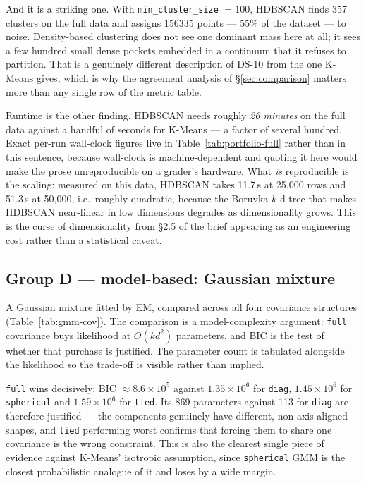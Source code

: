 \documentclass[11pt, a4paper]{article}
\providecommand{\num}[1]{#1}
\begin{document}
And it is a striking one. With \texttt{min\_cluster\_size} $=100$, HDBSCAN finds
\num{357} clusters on the full data and assigns \num{156335} points --- 55\% of
the dataset --- to noise. Density-based clustering does not see one dominant mass
here at all; it sees a few hundred small dense pockets embedded in a continuum
that it refuses to partition. That is a genuinely different description of DS-10
from the one K-Means gives, which is why the agreement analysis of
\S\ref{sec:comparison} matters more than any single row of the metric table.

Runtime is the other finding. HDBSCAN needs roughly \emph{26 minutes} on the full
data against a handful of seconds for K-Means --- a factor of several hundred.
Exact per-run wall-clock figures live in Table~\ref{tab:portfolio-full} rather
than in this sentence, because wall-clock is machine-dependent and quoting it
here would make the prose unreproducible on a grader's hardware. What \emph{is}
reproducible is the scaling: measured on this data, HDBSCAN takes 11.7\,s at
25{,}000 rows and 51.3\,s at 50{,}000, i.e.\ roughly quadratic, because the
Boruvka $k$-d tree that makes HDBSCAN near-linear in low dimensions degrades as
dimensionality grows. This is the curse of dimensionality from \S2.5 of the brief
appearing as an engineering cost rather than a statistical caveat.

\subsection{Group D --- model-based: Gaussian mixture}
A Gaussian mixture fitted by EM, compared across all four covariance structures
(Table~\ref{tab:gmm-cov}). The comparison is a model-complexity argument:
\texttt{full} covariance buys likelihood at $O(kd^2)$ parameters, and BIC is the
test of whether that purchase is justified. The parameter count is tabulated
alongside the likelihood so the trade-off is visible rather than implied.



\texttt{full} wins decisively: BIC $\approx 8.6\times10^{5}$ against
$1.35\times10^{6}$ for \texttt{diag}, $1.45\times10^{6}$ for \texttt{spherical}
and $1.59\times10^{6}$ for \texttt{tied}. Its \num{869} parameters against
\num{113} for \texttt{diag} are therefore justified --- the components genuinely
have different, non-axis-aligned shapes, and \texttt{tied} performing worst
confirms that forcing them to share one covariance is the wrong constraint. This
is also the clearest single piece of evidence against K-Means' isotropic
assumption, since \texttt{spherical} GMM is the closest probabilistic analogue of
it and loses by a wide margin.
\end{document}
